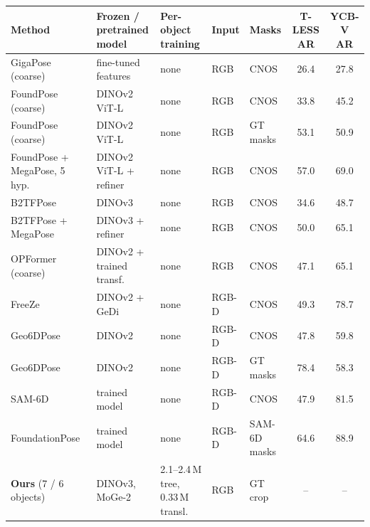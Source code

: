 \begin{tabular}{@{}l l l l l c c@{}}
\toprule
Method & Frozen / pretrained model & Per-object training & Input & Masks & T-LESS AR & YCB-V AR \\
\midrule
GigaPose (coarse)~\cite{nguyen2024gigapose} & fine-tuned features & none & RGB & CNOS & 26.4 & 27.8 \\
FoundPose (coarse)~\cite{ornek2024foundpose} & DINOv2 ViT-L & none & RGB & CNOS & 33.8 & 45.2 \\
FoundPose (coarse)~\cite{ornek2024foundpose} & DINOv2 ViT-L & none & RGB & GT masks & 53.1 & 50.9 \\
FoundPose + MegaPose, 5 hyp.~\cite{ornek2024foundpose} & DINOv2 ViT-L + refiner & none & RGB & CNOS & 57.0 & 69.0 \\
B2TFPose~\cite{rafiaei2026b2tfpose} & DINOv3 & none & RGB & CNOS & 34.6 & 48.7 \\
B2TFPose + MegaPose~\cite{rafiaei2026b2tfpose} & DINOv3 + refiner & none & RGB & CNOS & 50.0 & 65.1 \\
OPFormer (coarse)~\cite{moroz2025opformer} & DINOv2 + trained transf. & none & RGB & CNOS & 47.1 & 65.1 \\
FreeZe~\cite{caraffa2024freeze} & DINOv2 + GeDi & none & RGB-D & CNOS & 49.3 & 78.7 \\
Geo6DPose~\cite{toro2025geo6dpose} & DINOv2 & none & RGB-D & CNOS & 47.8 & 59.8 \\
Geo6DPose~\cite{toro2025geo6dpose} & DINOv2 & none & RGB-D & GT masks & 78.4 & 58.3 \\
SAM-6D~\cite{lin2024sam6d} & trained model & none & RGB-D & CNOS & 47.9 & 81.5 \\
FoundationPose~\cite{wen2024foundationpose} & trained model & none & RGB-D & SAM-6D masks & 64.6 & 88.9 \\
\midrule
\textbf{Ours} (7 / 6 objects) & DINOv3, MoGe-2 & 2.1--2.4\,M tree, 0.33\,M transl. & RGB & GT crop & -- & -- \\
\bottomrule
\end{tabular}